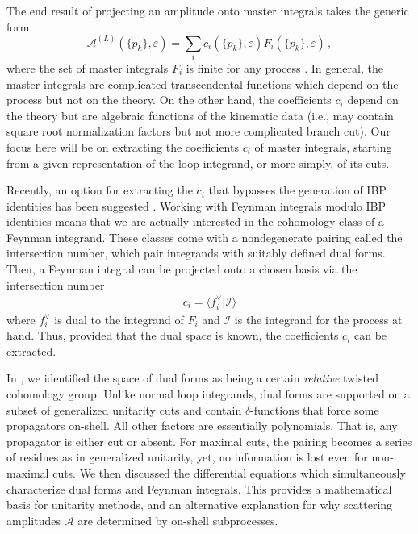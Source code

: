 \documentclass[11pt]{article}
\newcommand{\be}{\begin{equation}}
\newcommand{\ee}{\end{equation}}
\newcommand{\la}{\langle}
\newcommand{\ra}{\rangle}
\newcommand{\eps}{\varepsilon}
\begin{document}
The end result of projecting an amplitude onto master integrals takes the generic form
\be
 \mathcal{A}^{(L)}(\{p_k\},\eps)  = \sum_i c_i(\{p_k\},\eps) F_i(\{p_k\},\eps)\,, \label{generalized unitarity}
\ee
where the set of master integrals $F_i$ is finite for any process \cite{Smirnov:2010hn, Lee:2013hzt, Bitoun:2018afx}.
In general, the master integrals are complicated transcendental functions which depend on the process but not on the theory.  On the other hand, the coefficients $c_i$ depend on the theory but are algebraic functions of the kinematic data (i.e., may contain square root normalization factors but not more complicated branch cut). 
Our focus here will be on extracting the coefficients $c_i$ of master integrals, starting from a given representation of the loop integrand, or more simply, of its cuts.

Recently, an option for extracting the $c_i$ that bypasses the generation of IBP identities has been suggested \cite{Mastrolia:2018uzb, Frellesvig:2019kgj, Frellesvig:2019uqt,  Mizera:2019vvs, Mizera:2020wdt, Frellesvig:2020qot}. 
Working with Feynman integrals modulo IBP identities means that we are actually interested in the cohomology class of a Feynman integrand. 
These classes come with a nondegenerate pairing called the intersection number, which pair integrands with suitably defined dual forms.
Then, a Feynman integral can be projected onto a chosen basis via the intersection number
\begin{align}
	c_i = \la f^\vee_i \vert \mathcal{I} \ra
\end{align}
where $f^\vee_i$ is dual to the integrand of $F_i$ and $\mathcal{I}$ is the integrand for the process at hand.
Thus, provided that the dual space is known, the coefficients $c_i$ can be extracted.

In \cite{Caron-Huot:2021xqj}, we identified the space of dual forms as being a certain \emph{relative} twisted cohomology group.
Unlike normal loop integrands, dual forms are supported on a subset of generalized unitarity cuts and contain $\delta$-functions that force some propagators on-shell.
All other factors are essentially polynomials. That is, any propagator is either cut or absent.
For maximal cuts, the pairing becomes a series of residues as in generalized unitarity, yet, no information is lost even for non-maximal cuts. 
We then discussed the differential equations which simultaneously characterize dual forms and Feynman integrals.
This provides a mathematical basis for unitarity methods, and an alternative explanation for why scattering amplitudes $\mathcal{A}$ are determined by on-shell subprocesses.  
\end{document}
